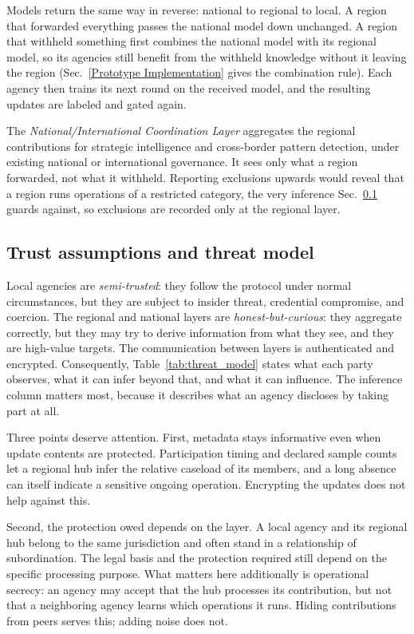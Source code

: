 Models return the same way in reverse: national to regional to local. A region that forwarded everything passes the national model down unchanged. A region that withheld something first combines the national model with its regional model, so its agencies still benefit from the withheld knowledge without it leaving the region (Sec.~\ref{Prototype Implementation} gives the combination rule). Each agency then trains its next round on the received model, and the resulting updates are labeled and gated again.

The \emph{National/International Coordination Layer} aggregates the regional contributions for strategic intelligence and cross-border pattern detection, under existing national or international governance. It sees only what a region forwarded, not what it withheld. Reporting exclusions upwards would reveal that a region runs operations of a restricted category, the very inference Sec.~\ref{subsec:threat_model} guards against, so exclusions are recorded only at the regional layer.



\subsection{Trust assumptions and threat model}
\label{subsec:threat_model}

Local agencies are \emph{semi-trusted}: they follow the protocol under normal circumstances, but they are subject to insider threat, credential compromise, and coercion. The regional and national layers are \emph{honest-but-curious}: they aggregate correctly, but they may try to derive information from what they see, and they are high-value targets. The communication between layers is authenticated and encrypted. Consequently, Table~\ref{tab:threat_model} states what each party observes, what it can infer beyond that, and what it can influence. The inference column matters most, because it describes what an agency discloses by taking part at all.

Three points deserve attention. First, metadata stays informative even when update contents are protected. Participation timing and declared sample counts let a regional hub infer the relative caseload of its members, and a long absence can itself indicate a sensitive ongoing operation. Encrypting the updates does not help against this.

Second, the protection owed depends on the layer. A local agency and its regional hub belong to the same jurisdiction and often stand in a relationship of subordination. The legal basis and the protection required still depend on the specific processing purpose. What matters here additionally is operational secrecy: an agency may accept that the hub processes its contribution, but not that a neighboring agency learns which operations it runs. Hiding contributions from peers serves this; adding noise does not.

